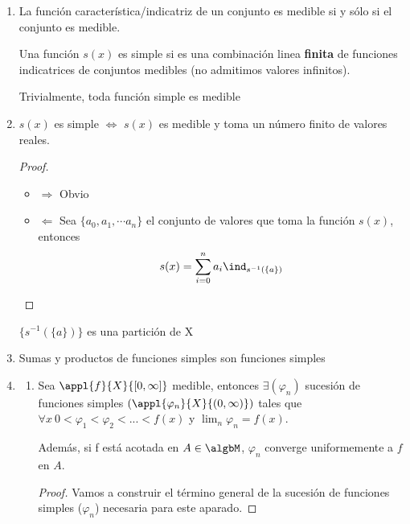\documentclass{apuntes}
\begin{document}
\begin{enumerate}
Así mismo, si la función $\appl{f}{X}{\cplex}$ es medible, entonces $sign(f)$ y $\abs{f}$ son medibles

\begin{proof}
La función signo es medible ya que es continua fuera del 0. Por tanto, la imagen inversa de un abierto que no contiene el 0 es un abierto medible. Si contiene al 0, la imagen inversa es un abierto $\cup$ $\{0\}$ que también es medible.
\end{proof}

\item La función característica/indicatriz de un conjunto es medible si y sólo si el conjunto es medible.
 
\begin{defn}
Una función $s(x)$ es simple si es una combinación linea \textbf{finita} de funciones indicatrices de conjuntos medibles (no admitimos valores infinitos).

Trivialmente, toda función simple es medible
\end{defn}

\item $s(x)$ es simple $\iff$ $s(x)$ es medible y toma un número finito de valores reales.
\begin{proof}
\begin{itemize}
\item $\Rightarrow$ Obvio
\item $\Leftarrow$ Sea $\{a_0, a_1, \cdots a_n\}$ el conjunto de valores que toma la función $s(x)$, entonces
\[s(x)= \sum_{i=0}^{n}a_i \ind_{s^{-1}(\{a\})}\]
\end{itemize}
\end{proof}

\obs $\{s^{-1}(\{a\})\}$ es una partición de X

\newpage
\item Sumas y productos de funciones simples son funciones simples

\item
\begin{enumerate}
\item Sea $\appl{f}{X}{[0,\infty]}$ medible, entonces $\exists (\varphi_n)$ sucesión de funciones simples $(\appl{\varphi_n}{X}{(0, \infty)})$ tales que
$\forall x \ 0 < \varphi_1 < \varphi_2 < ... < f(x)$ y $\lim_n \varphi_n = f(x)$.

Además, si f está acotada en $A \in \algbM$, $\varphi_n$ converge uniformemente a $f$ en $A$.

\begin{proof}
Vamos a construir el término general de la sucesión de funciones simples ($\varphi_n$) necesaria para este aparado.


\end{proof}
\end{enumerate}
\end{enumerate}
\end{document}
